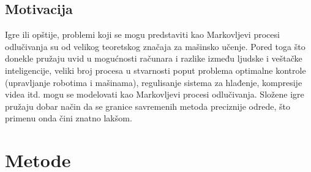 \documentclass[a4paper,fleqn,12pt]{JMThesis}
\theoremstyle{plain}
\theoremstyle{definition}
\theoremstyle{definition}
\begin{document}
\section[Motivacija]{Motivacija}
Igre ili opštije, problemi koji se mogu predstaviti kao Markovljevi procesi odlučivanja su od velikog teoretskog značaja za mašinsko učenje. Pored toga što donekle pružaju uvid u mogućnosti računara i razlike između ljudske i veštačke inteligencije, veliki broj procesa u stvarnosti poput problema optimalne kontrole (upravljanje robotima i mašinama), regulisanje sistema za hlađenje, kompresije videa itd. mogu se modelovati kao Markovljevi procesi odlučivanja. Složene igre pružaju dobar način da se granice savremenih metoda preciznije odrede, što primenu onda čini znatno lakšom. 

\chapter[Metode]{Metode}
\end{document}

